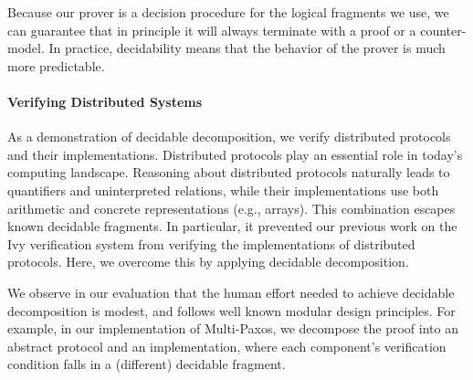 Because our prover is a decision procedure for the logical fragments
we use, we can guarantee that in principle it will always terminate
with a proof or a counter-model. In practice, decidability means that
the behavior of the prover is much more predictable.



\paragraph{Verifying Distributed Systems}

As a demonstration of decidable decomposition, we verify distributed protocols and
their implementations. %
Distributed protocols play an essential role in today's computing landscape.
Reasoning about distributed protocols naturally leads to quantifiers and uninterpreted relations,
while their implementations use both arithmetic and concrete
representations (e.g., arrays). This combination escapes known decidable fragments. In particular, it prevented our previous work on the Ivy verification system from verifying
the implementations of distributed protocols.
Here, we overcome this by applying decidable decomposition.


We observe in our evaluation that the human effort needed to achieve
decidable decomposition is modest, and follows well known modular design principles.
For example, in our implementation of Multi-Paxos, we decompose the proof into an abstract
protocol and an implementation, where each component's verification
condition falls in a (different) decidable fragment. 

